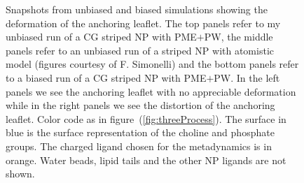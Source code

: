 \begin{figure}[ht!]
{		}%
		\caption{Snapshots from unbiased and biased simulations showing the deformation of the anchoring leaflet. The top panels refer to my unbiased run of a \acs{CG} striped \acs{NP} with \acs{PME}$+$\acs{PW}, the middle panels refer to an unbiased run of a striped \acs{NP} with atomistic model (figures courtesy of F. Simonelli) and the bottom panels refer to a biased run of a \acs{CG} striped \acs{NP} with \acs{PME}$+$\acs{PW}. In the left panels we see the anchoring leaflet with no appreciable deformation while in the right panels we see the distortion of the anchoring leaflet. Color code as in figure~(\ref{fig:threeProcess}). The surface in blue is the surface representation of the choline and phosphate groups. The charged ligand chosen for the metadynamics is in orange. Water beads, lipid tails and the other \acs{NP} ligands are not shown.}%
		\label{fig:engulfmentFrame}
\end{figure}

